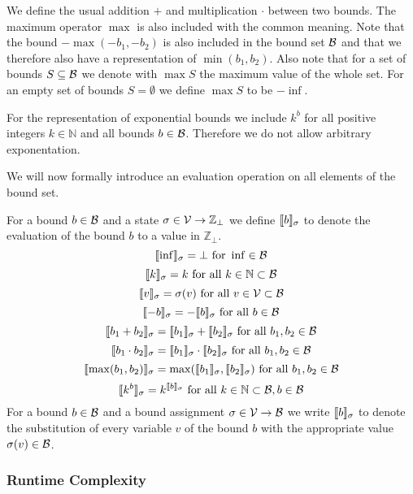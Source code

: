 We define the usual addition $+$ and multiplication $\cdot$ between two bounds.
The maximum operator $\max$ is also included with the common meaning.
Note that the bound $-\max(-b_1,-b_2)$ is also included in the bound set $\mathcal{B}$ and that we therefore also have a representation of $\min(b_1,b_2)$.
Also note that for a set of bounds $S \subseteq \mathcal{B}$ we denote with $\max S$ the maximum value of the whole set.
For an empty set of bounds $S = \emptyset$ we define $\max S$ to be $-\inf$.

For the representation of exponential bounds we include $k^b$ for all positive integers $k \in \mathbb{N}$ and all bounds $b \in \mathcal{B}$.
Therefore we do not allow arbitrary exponentation.


We will now formally introduce an evaluation operation on all elements of the bound set.

\begin{definition}
  For a bound $b \in \mathcal{B}$ and a state $\sigma \in \mathcal{V} \rightarrow \mathbb{Z}_\bot$ we define $\llbracket b \rrbracket_{\sigma}$ to denote the evaluation of the bound $b$ to a value in $\mathbb{Z}_\bot$.
  \[ \llbracket \inf \rrbracket_{\sigma} = \bot \text{ for } \inf \in \mathcal{B} \] 
  \[ \llbracket k \rrbracket_{\sigma} = k \text{ for all } k \in \mathbb{N} \subset \mathcal{B} \] 
  \[ \llbracket v \rrbracket_{\sigma} = \sigma(v) \text{ for all } v \in \mathcal{V} \subset \mathcal{B} \] 
  \[ \llbracket -b \rrbracket_{\sigma} = -\llbracket b \rrbracket_{\sigma} \text{ for all } b \in \mathcal{B} \] 
  \[ \llbracket b_1 + b_2 \rrbracket_{\sigma} = \llbracket b_1 \rrbracket_{\sigma} + \llbracket b_2 \rrbracket_{\sigma} \text{ for all } b_1, b_2 \in \mathcal{B} \] 
  \[ \llbracket b_1 \cdot b_2 \rrbracket_{\sigma} = \llbracket b_1 \rrbracket_{\sigma} \cdot \llbracket b_2 \rrbracket_{\sigma} \text{ for all } b_1, b_2 \in \mathcal{B} \] 
  \[ \llbracket \max(b_1, b_2) \rrbracket_{\sigma} = \max(\llbracket b_1 \rrbracket_{\sigma}, \llbracket b_2 \rrbracket_{\sigma}) \text{ for all } b_1, b_2 \in \mathcal{B} \]
  \[ \llbracket k^b \rrbracket_{\sigma} = k^{\llbracket b \rrbracket_{\sigma}} \text{ for all } k \in \mathbb{N} \subset \mathcal{B}, b \in \mathcal{B} \]  
  For a bound $b \in \mathcal{B}$ and a bound assignment $\sigma \in \mathcal{V} \rightarrow \mathcal{B}$ we write $\llbracket b \rrbracket_{\sigma}$ to denote the substitution of every variable $v$ of the bound $b$ with the appropriate value $\sigma(v) \in \mathcal{B}$.
\end{definition}

\subsubsection{Runtime Complexity}

